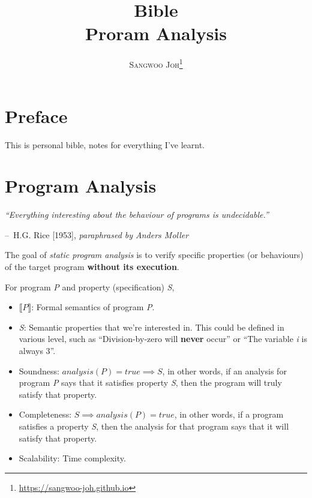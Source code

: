 \documentclass[12pt, twopage]{book}
\title{
  \Huge \textbf{Bible}
  \\
  \huge {Proram Analysis}
}
\author{\textsc{Sangwoo Joh}\footnote{\url{https://sangwoo-joh.github.io}}}
\makeatletter
\newenvironment{chapquote}[2][2em]
{\setlength{\@tempdima}{#1}%
  \def\chapquote@author{#2}%
  \parshape 1 \@tempdima \dimexpr\textwidth-2\@tempdima\relax%
  \itshape}
{\par\normalfont\hfill--\ \chapquote@author\hspace*{\@tempdima}\par\bigskip}
\makeatother
\begin{document}
\frontmatter
\maketitle

\tableofcontents  %

\mainmatter


\chapter*{Preface}
This is personal bible, notes for everything I've learnt.


\chapter{Program Analysis}
\begin{chapquote}{H.G. Rice [1953], \textit{paraphrased by Anders Moller}}
  ``Everything interesting about the behaviour of programs is
  undecidable.''
\end{chapquote}

The goal of \textit{static program analysis} is to verify specific
properties (or behaviours) of the target program \textbf{without its
  execution}.

For program \textsl{P} and property (specification) \textsl{S},

\begin{itemize}
\item $ \llbracket P \rrbracket $: Formal semantics of program \textsl{P}.

\item \textsl{S}: Semantic properties that we're interested in. This
  could be defined in various level, such as ``Division-by-zero will
  \textbf{never} occur'' or ``The variable \textit{i} is always 3''.

\item Soundness: $ analysis(P) = true \implies S $, in other words, if
  an analysis for program \textsl{P} says that it satisfies property
  \textsl{S}, then the program will truly satisfy that property.

\item Completeness: $ S \implies analysis(P) = true $, in other words,
  if a program satisfies a property \textsl{S}, then the analysis for
  that program says that it will satisfy that property.

\item Scalability: Time complexity.
\end{itemize}
\end{document}
